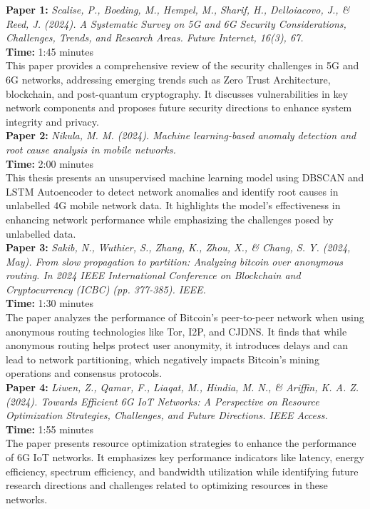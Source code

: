 \documentclass[10pt]{article}
\begin{document}
\noindent\textbf{Paper 1:} \textit{Scalise, P., Boeding, M., Hempel, M., Sharif, H., Delloiacovo, J., \& Reed, J. (2024). A Systematic Survey on 5G and 6G Security Considerations, Challenges, Trends, and Research Areas. Future Internet, 16(3), 67.} \\
\textbf{Time:} 1:45 minutes \\
This paper provides a comprehensive review of the security challenges in 5G and 6G networks, addressing emerging trends such as Zero Trust Architecture, blockchain, and post-quantum cryptography. It discusses vulnerabilities in key network components and proposes future security directions to enhance system integrity and privacy. \\

\noindent\textbf{Paper 2:} \textit{Nikula, M. M. (2024). Machine learning-based anomaly detection and root cause analysis in mobile networks.} \\
\textbf{Time:} 2:00 minutes \\
This thesis presents an unsupervised machine learning model using DBSCAN and LSTM Autoencoder to detect network anomalies and identify root causes in unlabelled 4G mobile network data. It highlights the model's effectiveness in enhancing network performance while emphasizing the challenges posed by unlabelled data. \\

\noindent\textbf{Paper 3:} \textit{Sakib, N., Wuthier, S., Zhang, K., Zhou, X., \& Chang, S. Y. (2024, May). From slow propagation to partition: Analyzing bitcoin over anonymous routing. In 2024 IEEE International Conference on Blockchain and Cryptocurrency (ICBC) (pp. 377-385). IEEE.} \\
\textbf{Time:} 1:30 minutes \\
The paper analyzes the performance of Bitcoin's peer-to-peer network when using anonymous routing technologies like Tor, I2P, and CJDNS. It finds that while anonymous routing helps protect user anonymity, it introduces delays and can lead to network partitioning, which negatively impacts Bitcoin's mining operations and consensus protocols. \\

\noindent\textbf{Paper 4:} \textit{Liwen, Z., Qamar, F., Liaqat, M., Hindia, M. N., \& Ariffin, K. A. Z. (2024). Towards Efficient 6G IoT Networks: A Perspective on Resource Optimization Strategies, Challenges, and Future Directions. IEEE Access.} \\
\textbf{Time:} 1:55 minutes \\
The paper presents resource optimization strategies to enhance the performance of 6G IoT networks. It emphasizes key performance indicators like latency, energy efficiency, spectrum efficiency, and bandwidth utilization while identifying future research directions and challenges related to optimizing resources in these networks. \\
\end{document}
